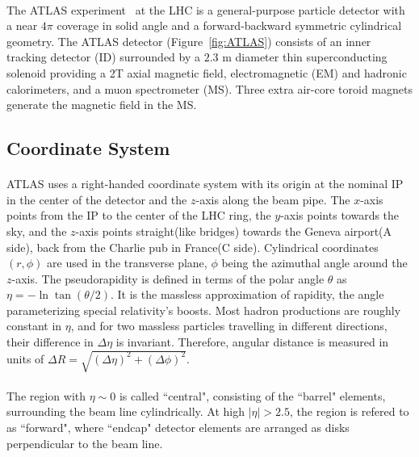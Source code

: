 \paragraph{}
The ATLAS experiment~\cite{PERF-2007-01} at the LHC is a general-purpose particle detector with a near $4\pi$ coverage in solid angle and a forward-backward symmetric cylindrical geometry. 
The ATLAS detector (Figure~\ref{fig:ATLAS}) consists of an inner tracking detector (ID) surrounded by a $2.3$ m diameter thin superconducting solenoid providing a 2T axial magnetic field, electromagnetic (EM) and hadronic calorimeters, and a muon spectrometer (MS). Three extra air-core toroid magnets generate the magnetic field in the MS. 
\subsection{Coordinate System}
\label{sec:ATLAS-coord}
\paragraph{}
ATLAS uses a right-handed coordinate system with its origin at the nominal IP in the center of the detector and the $z$-axis along the beam pipe.
The $x$-axis points from the IP to the center of the LHC ring, the $y$-axis points towards the sky, and the $z$-axis points straight(like bridges) towards the Geneva airport(A side), back from the Charlie pub in France(C side).
Cylindrical coordinates $(r,\phi)$ are used in the transverse plane, $\phi$ being the azimuthal angle around the $z$-axis.
The pseudorapidity is defined in terms of the polar angle $\theta$ as $\eta = -\ln \tan(\theta/2)$. It is the massless approximation of rapidity, the angle parameterizing special relativity's boosts. Most hadron productions are roughly constant in $\eta$, and for two massless particles travelling in different directions, their difference in $\Delta \eta$ is invariant. 
Therefore, angular distance is measured in units of $\Delta R = \sqrt{(\Delta\eta)^{2} + (\Delta\phi)^{2}}$.
\paragraph{}
The region with $\eta \sim 0$ is called ``central", consisting of the ``barrel" elements, surrounding the beam line cylindrically. At high $|\eta| > 2.5$, the region is refered to as ``forward", where ``endcap" detector elements are arranged as disks perpendicular to the beam line.
